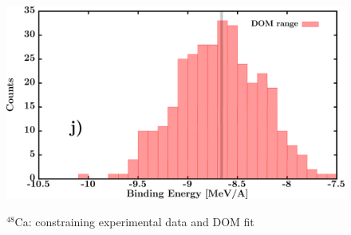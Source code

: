 \documentclass[twocolumn,secnumarabic,amssymb, nobibnotes, aps, prl,
superscriptaddress, nobalancelastpage, draft]{revtex4}
\newcommand{\caEight}{\ensuremath{^{48}}C\lowercase{a}}
\begin{document}
\begin{figure}[!htb]
\begin{minipage}{0.4\linewidth}
        \label{DOM_ca48_RMSRadius}
    \end{minipage}\hspace{6pt}
    \begin{minipage}{0.4\linewidth}
        \centering
        \includegraphics[width=\linewidth]{figures/ca48_BE.png}
        \label{DOM_ca48_BE}
    \end{minipage}
    \caption{\caEight: constraining experimental data and DOM fit}
    \label{DOM_ca48_structural}
\end{figure}
\end{document}
